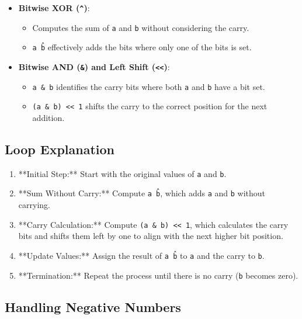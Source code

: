 \begin{itemize}
    \item \textbf{Bitwise XOR (\texttt{\^})}: 
    \begin{itemize}
        \item Computes the sum of \texttt{a} and \texttt{b} without considering the carry.
        \item \texttt{a \^ b} effectively adds the bits where only one of the bits is set.
    \end{itemize}
    
    \item \textbf{Bitwise AND (\texttt{\&}) and Left Shift (\texttt{<<})}: 
    \begin{itemize}
        \item \texttt{a \& b} identifies the carry bits where both \texttt{a} and \texttt{b} have a bit set.
        \item \texttt{(a \& b) << 1} shifts the carry to the correct position for the next addition.
    \end{itemize}
\end{itemize}

\subsection*{Loop Explanation}

\begin{enumerate}
    \item **Initial Step:** Start with the original values of \texttt{a} and \texttt{b}.
    
    \item **Sum Without Carry:** Compute \texttt{a \^ b}, which adds \texttt{a} and \texttt{b} without carrying.
    
    \item **Carry Calculation:** Compute \texttt{(a \& b) << 1}, which calculates the carry bits and shifts them left by one to align with the next higher bit position.
    
    \item **Update Values:** Assign the result of \texttt{a \^ b} to \texttt{a} and the carry to \texttt{b}.
    
    \item **Termination:** Repeat the process until there is no carry (\texttt{b} becomes zero).
\end{enumerate}

\subsection*{Handling Negative Numbers}


